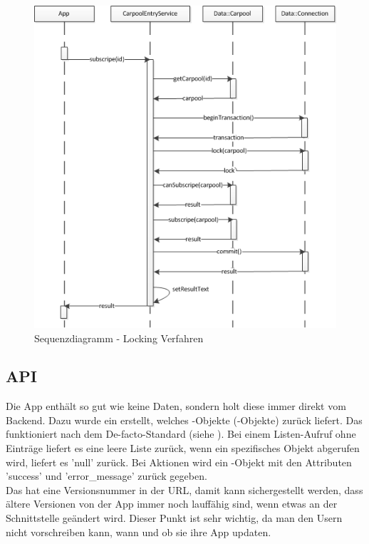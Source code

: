 \begin{figure}[h]
\centering
\includegraphics[scale=0.75]{images/visio/locking_verfahren.png}
\caption{Sequenzdiagramm - Locking Verfahren}
\label{fig:locking_verfahren}
\end{figure}

\FloatBarrier
\subsection{API}
Die App enthält so gut wie keine Daten, sondern holt diese immer direkt vom Backend. Dazu wurde ein   erstellt, welches -Objekte (-Objekte) zurück liefert. Das  funktioniert nach dem De-facto-Standard (siehe \cite{wiki_restful}). Bei einem Listen-Aufruf ohne Einträge liefert es eine leere Liste zurück, wenn ein spezifisches Objekt abgerufen wird, liefert es 'null' zurück. Bei Aktionen wird ein -Objekt mit den Attributen 'success' und 'error\_message' zurück gegeben.\\

Das  hat eine Versionsnummer in der URL, damit kann sichergestellt werden, dass ältere Versionen von der App immer noch lauffähig sind, wenn etwas an der Schnittstelle geändert wird. Dieser Punkt ist sehr wichtig, da man den Usern nicht vorschreiben kann, wann und ob sie ihre App updaten.

